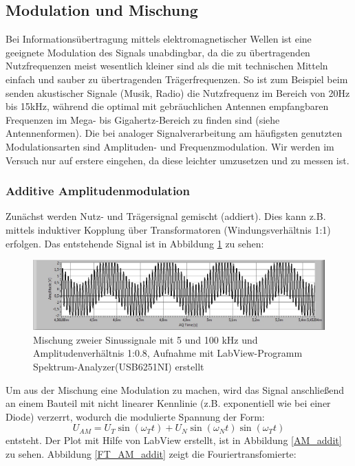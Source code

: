 
\subsection{Modulation und Mischung} %
\label{sub:modulation_und_mischung}

	Bei Informationsübertragung mittels elektromagnetischer Wellen ist eine geeignete Modulation des Signals unabdingbar, da die zu übertragenden Nutzfrequenzen meist wesentlich kleiner sind als die mit technischen Mitteln einfach und sauber zu übertragenden Trägerfrequenzen. 
	So ist zum Beispiel beim senden akustischer Signale (Musik, Radio) die Nutzfrequenz im Bereich von 20Hz bis 15kHz, während die optimal mit gebräuchlichen Antennen empfangbaren Frequenzen im Mega- bis Gigahertz-Bereich zu finden sind (siehe Antennenformen). 
	Die bei analoger Signalverarbeitung am häufigsten genutzten Modulationsarten sind Amplituden- und Frequenzmodulation. 
	Wir werden im Versuch nur auf erstere eingehen, da diese leichter umzusetzen und zu messen ist. \\

	
	\subsubsection{Additive Amplitudenmodulation} %
	\label{ssub:additive_amplitudenmodulation}
	
		Zunächst werden Nutz- und Trägersignal gemischt (addiert). 
		Dies kann z.B. mittels induktiver Kopplung über Transformatoren (Windungsverhältnis 1:1) erfolgen. 
		Das entstehende Signal ist in Abbildung \ref{Mischung} zu sehen:

		\begin{figure}[H]
			\center	
			\includegraphics[scale = 0.45]{messwerte/Mischung.jpg}	
			\caption{\centering Mischung zweier Sinussignale mit 5 und 100 kHz und Amplitudenverhältnis 1:0.8, Aufnahme mit LabView-Programm Spektrum-Analyzer(USB6251NI) erstellt} %
			\label{Mischung}
		\end{figure}

		Um aus der Mischung eine Modulation zu machen, wird das Signal anschließend an einem Bauteil mit nicht linearer Kennlinie (z.B. exponentiell wie bei einer Diode) verzerrt, wodurch die modulierte Spannung der Form:
		\begin{equation}
			U_{AM} = U_T \sin (\omega_T t) + U_N \sin (\omega_N t) \sin (\omega_T t)
		\end{equation}
		entsteht. Der Plot mit Hilfe von LabView erstellt, ist in Abbildung \ref{AM_addit} zu sehen. Abbildung \ref{FT_AM_addit} zeigt die Fouriertransfomierte:

